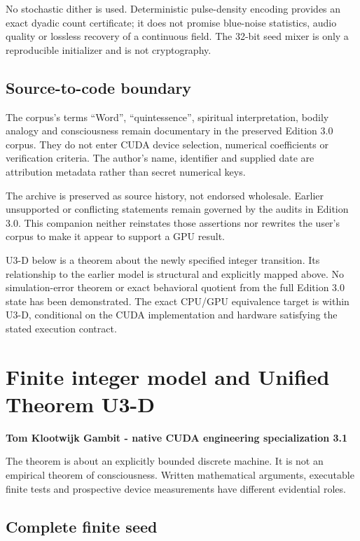 \documentclass[11pt,a4paper]{article}
\begin{document}
No stochastic dither is used. Deterministic pulse-density encoding provides an exact dyadic count certificate; it does not promise blue-noise statistics, audio quality or lossless recovery of a continuous field. The 32-bit seed mixer is only a reproducible initializer and is not cryptography.

\subsection{Source-to-code boundary}\label{source-to-code-boundary}

The corpus's terms ``Word'', ``quintessence'', spiritual interpretation, bodily analogy and consciousness remain documentary in the preserved Edition 3.0 corpus. They do not enter CUDA device selection, numerical coefficients or verification criteria. The author's name, identifier and supplied date are attribution metadata rather than secret numerical keys.

The archive is preserved as source history, not endorsed wholesale. Earlier unsupported or conflicting statements remain governed by the audits in Edition 3.0. This companion neither reinstates those assertions nor rewrites the user's corpus to make it appear to support a GPU result.

U3-D below is a theorem about the newly specified integer transition. Its relationship to the earlier model is structural and explicitly mapped above. No simulation-error theorem or exact behavioral quotient from the full Edition 3.0 state has been demonstrated. The exact CPU/GPU equivalence target is within U3-D, conditional on the CUDA implementation and hardware satisfying the stated execution contract.

\clearpage

\section{Finite integer model and Unified Theorem U3-D}\label{finite-integer-model-and-unified-theorem-u3-d}

\textbf{Tom Klootwijk Gambit - native CUDA engineering specialization 3.1}

The theorem is about an explicitly bounded discrete machine. It is not an empirical theorem of consciousness. Written mathematical arguments, executable finite tests and prospective device measurements have different evidential roles.

\subsection{Complete finite seed}\label{complete-finite-seed}
\end{document}
